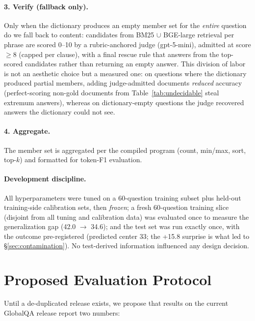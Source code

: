 \documentclass[11pt]{article}
\begin{document}
\paragraph{3. Verify (fallback only).} Only when the dictionary produces an empty member set for the \emph{entire} question do we fall back to content: candidates from BM25 $\cup$ BGE-large \cite{bge} retrieval per phrase are scored 0--10 by a rubric-anchored judge (gpt-5-mini), admitted at score $\geq 8$ (capped per clause), with a final rescue rule that answers from the top-scored candidates rather than returning an empty answer. This division of labor is not an aesthetic choice but a measured one: on questions where the dictionary produced partial members, adding judge-admitted documents \emph{reduced} accuracy (perfect-scoring non-gold documents from Table~\ref{tab:undecidable} steal extremum answers), whereas on dictionary-empty questions the judge recovered answers the dictionary could not see.

\paragraph{4. Aggregate.} The member set is aggregated per the compiled program (count, min/max, sort, top-$k$) and formatted for token-F1 evaluation.

\paragraph{Development discipline.} All hyperparameters were tuned on a 60-question training subset plus held-out training-side calibration sets, then \emph{frozen}; a fresh 60-question training slice (disjoint from all tuning and calibration data) was evaluated once to measure the generalization gap (42.0 $\rightarrow$ 34.6); and the test set was run exactly once, with the outcome pre-registered (predicted center 33; the +15.8 surprise is what led to \S\ref{sec:contamination}). No test-derived information influenced any design decision.

\section{Proposed Evaluation Protocol}
\label{sec:protocol}

Until a de-duplicated release exists, we propose that results on the current GlobalQA release report two numbers:
\end{document}
